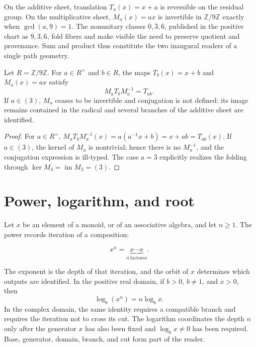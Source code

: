On the additive sheet, translation \(T_a(x)=x+a\) is reversible on the residual
group. On the multiplicative sheet, \(M_a(x)=ax\) is invertible in
\(\mathbb Z/9\mathbb Z\) exactly when \(\gcd(a,9)=1\). The nonunitary
classes \(\overline0,\overline3,\overline6\), published in the positive
chart as \(9,3,6\), fold fibers and make visible the need to
preserve quotient and provenance. Sum and product thus constitute the two
inaugural readers of a single path geometry.

\begin{lemma}
\label{lem:conjugacion-afin-app-rev3}
Let \(R=\mathbb Z/9\mathbb Z\). For \(a\in R^\times\) and \(b\in R\), the
maps \(T_b(x)=x+b\) and \(M_a(x)=ax\) satisfy
\begin{equation}
 M_aT_bM_a^{-1}=T_{ab}.
 \label{eq:conjugacion-afin-app-rev3}
\end{equation}
If \(a\in(3)\), \(M_a\) ceases to be invertible and conjugation is not
defined: its image remains contained in the radical and several branches of the
additive sheet are identified.
\end{lemma}

\begin{proof}
For \(a\in R^\times\),
\(
 M_aT_bM_a^{-1}(x)=a(a^{-1}x+b)=x+ab=T_{ab}(x)
\).
If \(a\in(3)\), the kernel of \(M_a\) is nontrivial; hence there is no
\(M_a^{-1}\), and the conjugation expression is ill-typed. The case
\(a=3\) explicitly realizes the folding through
\(\ker M_3=\operatorname{im}M_3=(3)\).
\end{proof}

\section{Power, logarithm, and root}

Let \(x\) be an element of a monoid, or of an associative algebra, and let
\(n\geq1\). The power records iteration of a composition:

\[
 x^n=\underbrace{x\cdots x}_{n\ \mathrm{factores}}.
\]

The exponent is the depth of that iteration, and the orbit of \(x\) determines
which outputs are identified. In the positive real domain, if \(b>0\),
\(b\neq1\), and \(x>0\), then
\[
 \log_b(x^n)=n\log_b x.
\]
In the complex domain, the same identity requires a compatible branch and
requires the iteration not to cross its cut. The logarithm coordinates the depth
\(n\) only after the generator \(x\) has also been fixed and
\(\log_b x\neq0\) has been required. Base, generator, domain, branch, and cut form part of the
reader.

